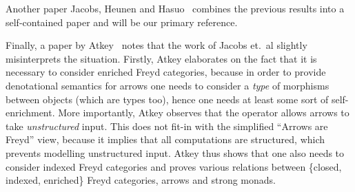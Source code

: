 
Another paper Jacobs, Heunen and Hasuo~\cite{cat-semantics-arr} combines the
previous results into a self-contained paper and will be our primary reference.

Finally, a paper by Atkey~\cite{atkey-fix} notes that the work of Jacobs et.~al
slightly misinterprets the situation. Firstly, Atkey elaborates on the fact
that it is necessary to consider enriched Freyd categories, because in order to
provide denotational semantics for arrows one needs to consider a \emph{type}
of morphisms between objects (which are types too), hence one needs at least
some sort of self-enrichment. More importantly, Atkey observes that the
\firstArr{} operator allows arrows to take \emph{unstructured} input. This does
not fit-in with the simplified ``Arrows are Freyd'' view, because it implies
that all computations are structured, which prevents modelling unstructured
input. Atkey thus shows that one also needs to consider indexed Freyd categories and
proves various relations between \{closed, indexed, enriched\} Freyd categories,
arrows and strong monads.

